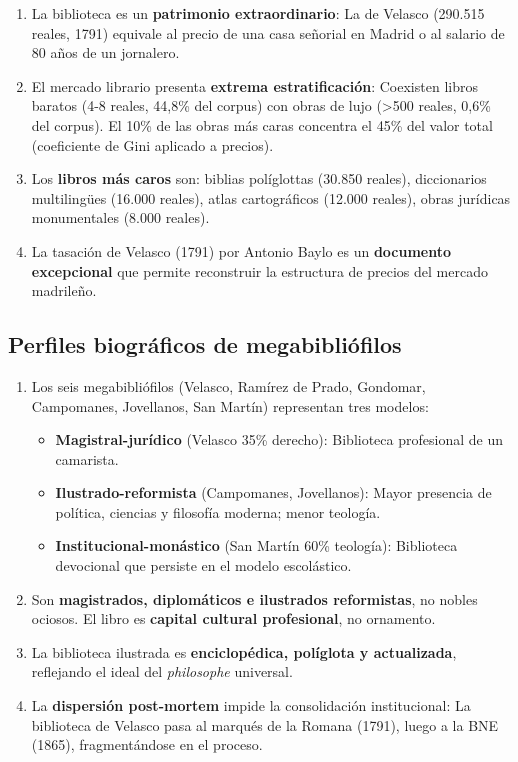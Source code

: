 \documentclass[11pt,a4paper]{article}
\begin{document}
\begin{enumerate}
\item La biblioteca es un \textbf{patrimonio extraordinario}: La de Velasco (290.515 reales, 1791) equivale al precio de una casa señorial en Madrid o al salario de 80 años de un jornalero.

\item El mercado librario presenta \textbf{extrema estratificación}: Coexisten libros baratos (4-8 reales, 44,8\% del corpus) con obras de lujo (>500 reales, 0,6\% del corpus). El 10\% de las obras más caras concentra el 45\% del valor total (coeficiente de Gini aplicado a precios).

\item Los \textbf{libros más caros} son: biblias políglottas (30.850 reales), diccionarios multilingües (16.000 reales), atlas cartográficos (12.000 reales), obras jurídicas monumentales (8.000 reales).

\item La tasación de Velasco (1791) por Antonio Baylo es un \textbf{documento excepcional} que permite reconstruir la estructura de precios del mercado madrileño.
\end{enumerate}

\subsection{Perfiles biográficos de megabibliófilos}

\begin{enumerate}
\item Los seis megabibliófilos (Velasco, Ramírez de Prado, Gondomar, Campomanes, Jovellanos, San Martín) representan tres modelos:
\begin{itemize}
\item \textbf{Magistral-jurídico} (Velasco 35\% derecho): Biblioteca profesional de un camarista.
\item \textbf{Ilustrado-reformista} (Campomanes, Jovellanos): Mayor presencia de política, ciencias y filosofía moderna; menor teología.
\item \textbf{Institucional-monástico} (San Martín 60\% teología): Biblioteca devocional que persiste en el modelo escolástico.
\end{itemize}

\item Son \textbf{magistrados, diplomáticos e ilustrados reformistas}, no nobles ociosos. El libro es \textbf{capital cultural profesional}, no ornamento.

\item La biblioteca ilustrada es \textbf{enciclopédica, políglota y actualizada}, reflejando el ideal del \textit{philosophe} universal.

\item La \textbf{dispersión post-mortem} impide la consolidación institucional: La biblioteca de Velasco pasa al marqués de la Romana (1791), luego a la BNE (1865), fragmentándose en el proceso.
\end{enumerate}
\end{document}
